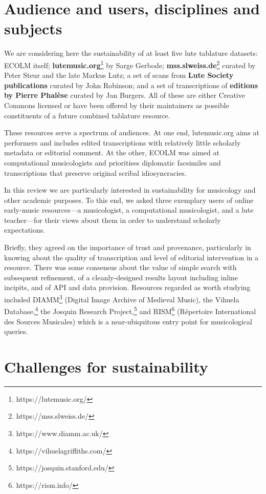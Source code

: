 \documentclass[sigconf]{acmart}
\begin{document}
\begin{sloppypar}
  \section{Audience and users, disciplines and subjects}\label{audience}

  We are considering here the sustainability of at least five lute
  tablature datasets: ECOLM itself; {\bf
    lutemusic.org}\footnote{https://lutemusic.org/} by Sarge Gerbode;
  {\bf mss.slweiss.de}\footnote{https://mss.slweiss.de/} curated by
  Peter Steur and the late Markus Lutz; a set of scans from {\bf Lute
    Society publications} curated by John Robinson; and a set of
  transcriptions of {\bf editions by Pierre Phal\`ese} curated by Jan
  Burgers. All of these are either Creative Commons licensed or have
  been offered by their maintainers as possible constituents of a
  future combined tablature resource.

  These resources serve a spectrum of audiences. At one end,
  lutemusic.org aims at performers and includes edited transcriptions
  with relatively little scholarly metadata or editorial comment. At
  the other, ECOLM was aimed at computational musicologists and
  prioritises diplomatic facsimiles and transcriptions that preserve
  original scribal idiosyncracies.

  In this review we are particularly interested in sustainability for
  musicology and other academic purposes. To this end, we asked three
  exemplary users of online early-music resources---a musicologist, a
  computational musicologist, and a lute teacher---for their views
  about them in order to understand scholarly expectations.

  Briefly, they agreed on the importance of trust and provenance,
  particularly in knowing about the quality of transcription and level
  of editorial intervention in a resource. There was some consensus
  about the value of simple search with subsequent refinement, of a
  cleanly-designed results layout including inline incipits, and of
  API and data provision. Resources regarded as worth studying
  included DIAMM\footnote{https://www.diamm.ac.uk/} (Digital Image
  Archive of Medieval Music), the Vihuela
  Database,\footnote{https://vihuelagriffiths.com/} the Josquin
  Research Project,\footnote{https://josquin.stanford.edu/} and
  RISM\footnote{https://rism.info/} (R\'epertoire International des
  Sources Musicales) which is a near-ubiquitous entry point for
  musicological queries.
  
  \section{Challenges for sustainability}\label{challenges}


\end{sloppypar}
\end{document}
